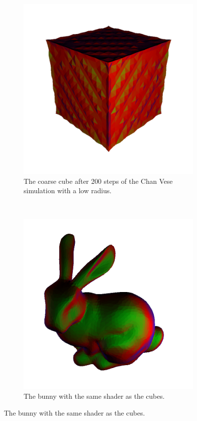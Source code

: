 \begin{figure}
\begin{subfigure}[t]{0.3\textwidth}
                \includegraphics[width=\textwidth]{img/gradientmat1.png}
                \caption{The coarse cube after 200 steps of the Chan Vese
                         simulation with a low radius.}
                \label{fig:gradientmat1}
        \end{subfigure}
        ~ %
        \begin{subfigure}[t]{0.3\textwidth}
                \includegraphics[width=\textwidth]{img/gradientmat2.png}
                \caption{The bunny with the same shader as the cubes.}
                \label{fig:gradientmat2}
        \end{subfigure}


\end{figure}
